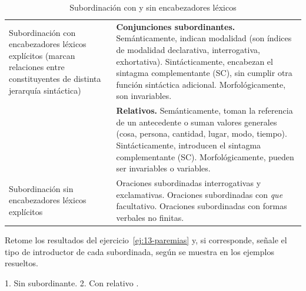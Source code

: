 {\small
\begin{longtable}{@{}>{\raggedright\arraybackslash}p{40mm}
    >{\raggedright\arraybackslash}p{83mm}@{}}
  \caption{Subordinación con y sin encabezadores léxicos}\label{tab:13-encabezadores}\\
  \toprule
  \endfirsthead
  \toprule
  \endhead
  Subordinación con encabezadores léxicos explícitos (marcan relaciones entre
    constituyentes de distinta jerarquía sintáctica) &
    \textbf{Conjunciones subordinantes.} Semánticamente, indican modalidad (son
    índices de modalidad declarativa, interrogativa, exhortativa).
    Sintácticamente, encabezan el sintagma complementante (SC), sin cumplir otra
    función sintáctica adicional. Morfológicamente, son invariables. \\
  \addlinespace
  & \textbf{Relativos.} Semánticamente, toman la referencia de un antecedente o
    suman valores generales (cosa, persona, cantidad, lugar, modo, tiempo).
    Sintácticamente, introducen el sintagma complementante (SC).
    Morfológicamente, pueden ser invariables o variables. \\
  \midrule
  Subordinación sin encabezadores léxicos explícitos &
    Oraciones subordinadas interrogativas y exclamativas. Oraciones subordinadas
    con \textit{que} facultativo. Oraciones subordinadas con formas verbales no
    finitas. \\
  \bottomrule
\end{longtable}}

\begin{ejercicio}\label{ej:13-introductor}
Retome los resultados del ejercicio~\ref{ej:13-paremias} y, si corresponde,
señale el tipo de introductor de cada subordinada, según se muestra en los
ejemplos resueltos.

\begin{resuelto}
1. Sin subordinante. 2. Con relativo .
\end{resuelto}
\end{ejercicio}

